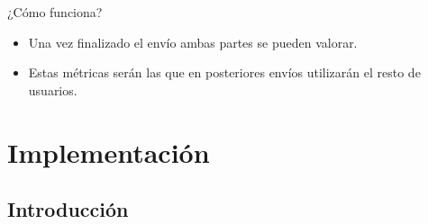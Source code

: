 \documentclass{beamer}
\begin{document}
            \begin{frame}{¿Cómo funciona?}
                \begin{itemize}
                    \item Una vez finalizado el envío ambas partes se pueden valorar.

                    \item Estas métricas serán las que en posteriores envíos utilizarán el resto de usuarios.
                \end{itemize}
            \end{frame}

    \section{Implementación}

        \subsection{Introducción}
\end{document}
